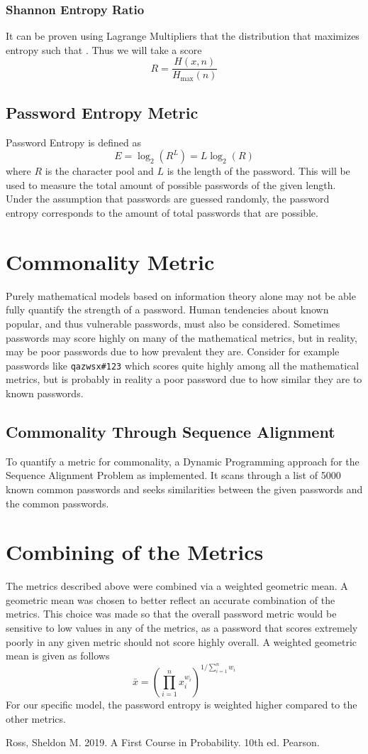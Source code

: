 \documentclass{article}
\begin{document}
\subsubsection{Shannon Entropy Ratio}
It can be proven using Lagrange Multipliers that the distribution that maximizes entropy such that .
Thus we will take a score 
\[
R = \frac{H(x, n)}{H_{\text{max}}(n)}
\]

\subsection{Password Entropy Metric}
Password Entropy is defined as 
\[
E=\log_2(R^L) = L\log_2(R)
\]
where $R$ is the character pool and $L$ is the length of the password.
This will be used to measure the total amount of possible passwords of the given length. Under the assumption that passwords are guessed randomly, the password entropy corresponds to the amount of total passwords that are possible.  

\section{Commonality Metric}
Purely mathematical models based on information theory alone may not be able fully quantify the strength of a password. Human tendencies about known popular, and thus vulnerable passwords, must also be considered. Sometimes passwords may score highly on many of the mathematical metrics, but in reality, may be poor passwords due to how prevalent they are. Consider for example passwords like 
\verb!qazwsx#123!
which scores quite highly among all the mathematical metrics, but is probably in reality a poor password due to how similar they are to known passwords.
\subsection{Commonality Through Sequence Alignment}
To quantify a metric for commonality, a Dynamic Programming approach for the Sequence Alignment Problem as implemented. It scans through a list of 5000 known common passwords and seeks similarities between the given passwords and the common passwords.

\section{Combining of the Metrics}
The metrics described above were combined via a weighted geometric mean. A geometric mean was chosen to better reflect an accurate combination of the metrics. 
This choice was made so that the overall password metric would be sensitive to low values in any of the metrics, as a password that scores extremely poorly in any given metric should not score highly overall.
A weighted geometric mean is given as follows
\[
\bar{x} = \left(\prod_{i=1}^{n} x_i^{w_i}\right)^{1/\sum_{i=1}^n w_i}
\]
For our specific model, the password entropy is weighted higher compared to the other metrics.

\newpage
\begin{thebibliography}{00}
 Ross, Sheldon M. 2019. A First Course in Probability. 10th ed. Pearson.
\end{thebibliography}
\end{document}
